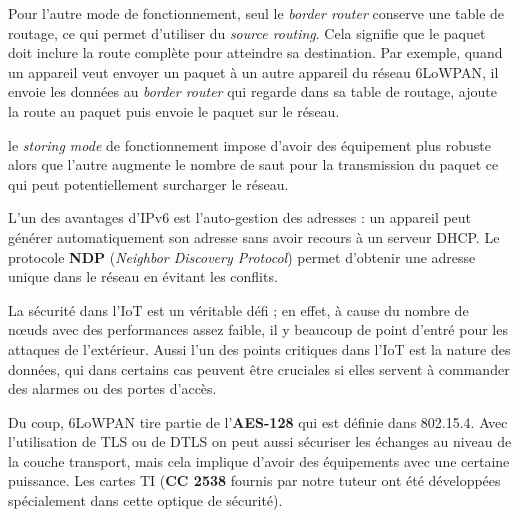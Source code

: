 Pour l'autre mode de fonctionnement, seul le \textit{border router} conserve une table de routage, ce qui permet d'utiliser du \textit{source routing}. Cela signifie que le paquet doit inclure la route complète pour atteindre sa destination. Par exemple, quand un appareil veut envoyer un paquet à un autre appareil du réseau 6LoWPAN, il envoie les données au \textit{border router} qui regarde dans sa table de routage, ajoute la route au paquet puis envoie le paquet sur le réseau.

le \textit{storing mode} de fonctionnement impose d'avoir des équipement plus robuste alors que l'autre augmente le nombre de saut pour la transmission du paquet ce qui peut potentiellement surcharger le réseau.

L'un des avantages d'IPv6 est l'auto-gestion des adresses : un appareil peut générer automatiquement son adresse sans avoir recours à un serveur DHCP. Le protocole \textbf{NDP} (\textit{Neighbor Discovery Protocol}) permet d'obtenir une adresse unique dans le réseau en évitant les conflits.

La sécurité dans l'IoT est un véritable défi ; en effet, à cause du nombre de nœuds avec des performances assez faible, il y beaucoup de point d'entré pour les attaques de l'extérieur. Aussi l'un des points critiques dans l'IoT est la nature des données, qui dans certains cas peuvent être cruciales si elles servent à commander des alarmes ou des portes d'accès.

Du coup, 6LoWPAN tire partie de l'\textbf{AES-128} qui est définie dans 802.15.4. Avec l'utilisation de TLS ou de DTLS on peut aussi sécuriser les échanges au niveau de la couche transport, mais cela implique d'avoir des équipements avec une certaine puissance. Les cartes TI (\textbf{CC 2538} fournis par notre tuteur ont été développées spécialement dans cette optique de sécurité).
